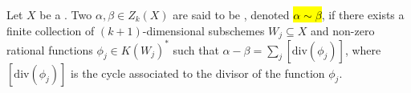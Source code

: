 \begin{definition} \label{definition:rationally_equivalent_k_dimensional_algebraic_cycles_of_a_noetherian_scheme}
Let $X$ be a . 
Two  $\alpha, \beta \in Z_k(X)$ are said to be , denoted \hl{$\alpha \sim \beta$}, if there exists a finite collection of $(k+1)$-dimensional   subschemes $W_j \subseteq X$ and non-zero rational functions $\phi_j \in K(W_j)^*$ such that $\alpha - \beta = \sum_j [\mathrm{div}(\phi_j)]$, where $[\mathrm{div}(\phi_j)]$ is the cycle associated to the divisor of the function $\phi_j$.
\end{definition}